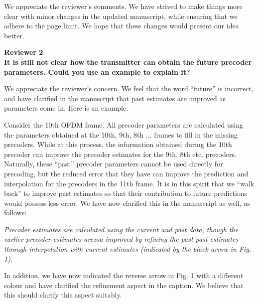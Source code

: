\documentclass[12pt]{letter}
\begin{document}
We appreciate the reviewer's comments. We have strived to make things
more clear with minor changes in the updated manuscript, while
ensuring that we adhere to the page limit. We hope that these changes
would present our idea better.

\textbf{Reviewer 2}\\

\textbf{It is still not clear how the transmitter can obtain the
  future precoder parameters.
  Could you use an example to explain it?}

We appreciate the reviewer's concern. We feel that the word ``future''
is incorrect, and have clarified in the manuscript that past estimates
are improved as parameters come in. Here is an example.

Consider the 10th OFDM frame. All precoder parameters are calculated
using the parameters obtained at the 10th, 9th, 8th ... frames to fill
in the missing precoders. While at this process, the information
obtained during the 10th precoder can improve the precoder estimates
for the 9th, 8th etc. precoders. Naturally, these ``past'' precoder
parameters cannot be used directly for precoding, but the reduced
error that they have can improve the prediction and interpolation for
the precoders in the 11th frame. It is in this spirit that we ``walk
back'' to improve past estimates so that their contribution to future
predictions would possess less error. We have now clarified this in
the manuscript as well, as follows:

\emph{Precoder estimates are calculated using
the current and past data, though the earlier precoder estimates
arexsa improved by refining the past past estimates through
interpolation with current estimates (indicated by the black arrow in
Fig. 1).}

In addition, we have now indicated the reverse arrow in Fig. 1 with a
different colour and have clarified the refinement aspect in the
caption. We believe that this should clarify this aspect suitably.
\end{document}
